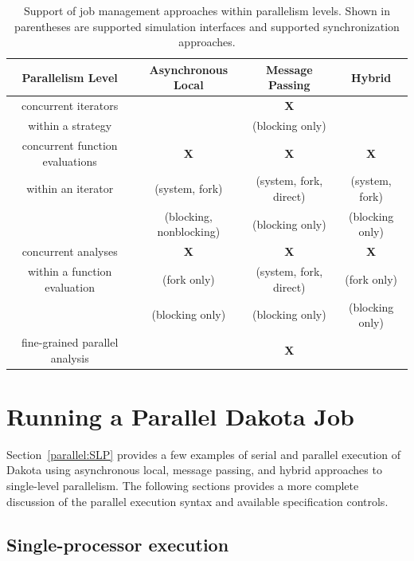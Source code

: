 \begin{table}
  \centering
  \caption{Support of job management approaches within parallelism levels.
  Shown in parentheses are supported simulation interfaces and supported
  synchronization approaches.}
  \label{parallel:table01}\vspace{2mm}
  \begin{tabular}{c||c|c|c|}
    \textbf{Parallelism Level} & \textbf{Asynchronous Local} &
    \textbf{Message Passing} & \textbf{Hybrid} \\
    \hline \hline
    concurrent iterators & & \textbf{X}      & \\
    within a strategy    & & (blocking only) & \\
    \hline
    concurrent function evaluations & \textbf{X} & \textbf{X} & \textbf{X} \\
    within an iterator          & (system, fork) & (system, fork, direct) &
    (system, fork) \\
    & (blocking, nonblocking) & (blocking only) & (blocking only) \\
    \hline
    concurrent analyses & \textbf{X} & \textbf{X} & \textbf{X} \\
    within a function evaluation & (fork only) & (system, fork, direct) &
    (fork only) \\
    & (blocking only) & (blocking only) & (blocking only) \\
    \hline
    fine-grained parallel analysis & & \textbf{X} & \\
    \hline
  \end{tabular}
\end{table}


\section{Running a Parallel Dakota Job}\label{parallel:running}


Section~\ref{parallel:SLP} provides a few examples of serial and
parallel execution of Dakota using asynchronous local, message
passing, and hybrid approaches to single-level parallelism.  The
following sections provides a more complete discussion of the parallel
execution syntax and available specification controls.


\subsection{Single-processor execution}\label{parallel:running:single}

